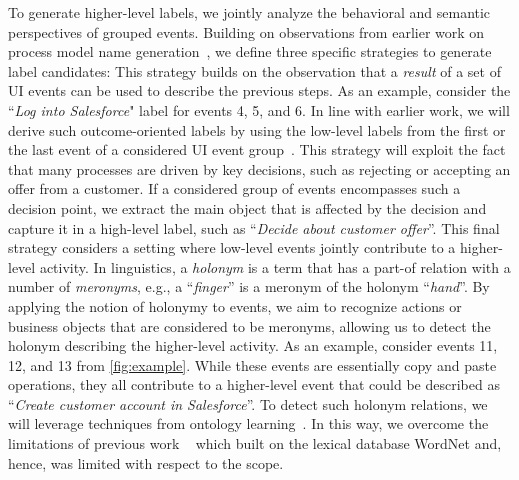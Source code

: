  To generate higher-level labels, we jointly analyze the behavioral and semantic perspectives of grouped events. Building on observations from earlier work on process model name generation~\cite{leopold2014simplifying}, we define three specific strategies to generate label candidates: 
%
This strategy builds on the observation that a \textit{result} of a set of UI events can be used to describe the previous steps.  
 As an example, consider the ``\textit{Log into Salesforce}" label for events 4, 5, and 6. In line with earlier work, we  will derive such outcome-oriented labels by using the low-level labels from the first or the last event of a considered UI event group~\cite{leopold2014simplifying}.  
%
 This strategy will exploit the fact that many processes are driven by key decisions, such as rejecting or accepting an offer from a customer. If a considered group of events encompasses such a decision point, we extract the main object that is affected by the decision and capture it in a high-level label, such as ``\textit{Decide about customer offer}''. 
%
This final strategy considers a setting where low-level events jointly contribute to a higher-level activity. In linguistics, a \textit{holonym} is a term that has a part-of relation with a number of \textit{meronyms}, e.g., a ``\textit{finger}'' is a meronym of the holonym ``\textit{hand}''.
By applying the notion of holonymy to events, we aim to recognize actions or business objects that are considered to be meronyms, allowing us to detect the holonym describing the higher-level activity. As an example, consider events 11, 12, and 13 from \autoref{fig:example}. While these events are essentially copy and paste operations, they all contribute to a higher-level event that could be described as ``\textit{Create customer account in Salesforce}''. To detect such holonym relations, we will leverage techniques from ontology learning~\cite{al2020automatic,wong2012ontology}. In this way, we overcome the limitations of previous work ~\cite{leopold2014simplifying} which built on the lexical database WordNet and, hence, was limited with respect to the scope.   


